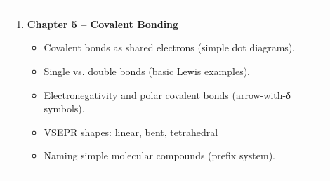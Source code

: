 \documentclass{article}
\begin{document}
\begin{tabular}{|p{0.9\linewidth}|}
\begin{enumerate}[label=\arabic*.]
    \item \textbf{Chapter 5 – Covalent Bonding}
    \begin{itemize}
        \item Covalent bonds as shared electrons (simple dot diagrams).
        \item Single vs. double bonds (basic Lewis examples).
        \item Electronegativity and polar covalent bonds (arrow-with-δ symbols).
        \item VSEPR shapes: linear, bent, tetrahedral 
        \item Naming simple molecular compounds (prefix system).
    \end{itemize}
\end{enumerate}\\[0.2cm]
\end{tabular}
\newpage
\end{document}
